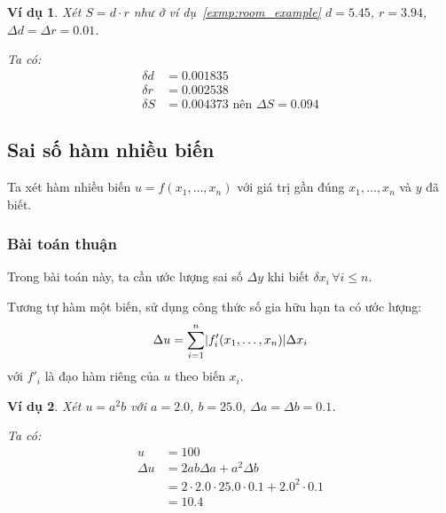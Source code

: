 \documentclass{book}
\newtheorem{exmp}{Ví dụ}[chapter]
\DeclarePairedDelimiter\abs{\lvert}{\rvert}%
\begin{document}
\begin{exmp}
    Xét \(S = d \cdot r\) như ở ví dụ~\ref{exmp:room_example} \(d =
    \num{5.45}\), \(r = \num{3.94}\), \(\Delta d = \Delta r = \num{0.01}\).

    Ta có:
    \[\begin{aligned}
        \delta d &= \num{0.001835} \\
        \delta r &= \num{0.002538} \\
        \delta S &= \num{0.004373} \text{ nên } \Delta S = \num{0.094}
    \end{aligned}\]
\end{exmp}

\subsection{Sai số hàm nhiều biến}

Ta xét hàm nhiều biến \(u = f(x_1, \ldots, x_n)\) với giá trị gần đúng \(x_1,
\ldots, x_n\) và \(y\) đã biết.

\subsubsection{Bài toán thuận}

Trong bài toán này, ta cần ước lượng sai số \(\Delta y\) khi biết \(\delta x_i
\, \forall i \leq n\).    %

Tương tự hàm một biến, sử dụng công thức số gia hữu hạn ta có ước lượng:
\begin{equation} \label{eq:absolute_error_of_function}
    \Delta u = \sum_{i=1}^{n} \abs{f'_i(x_1, \ldots, x_n)} \Delta x_i
\end{equation}
với \(f'_i\) là đạo hàm riêng của \(u\) theo biến \(x_i\).

\begin{exmp}
    Xét \(u = a^2 b\) với \(a = \num{2.0}\), \(b = \num{25.0}\), \(\Delta a =
    \Delta b = \num{0.1}\).

    Ta có:
    \[\begin{aligned}
               u &= 100 \\
        \Delta u &= 2ab \Delta a + a^2 \Delta b \\
                 &= 2 \cdot \num{2.0} \cdot \num{25.0} \cdot \num{0.1} + \num{2.0}^2 \cdot \num{0.1} \\
                 &= \num{10.4}
    \end{aligned}\]
\end{exmp}
\end{document}
